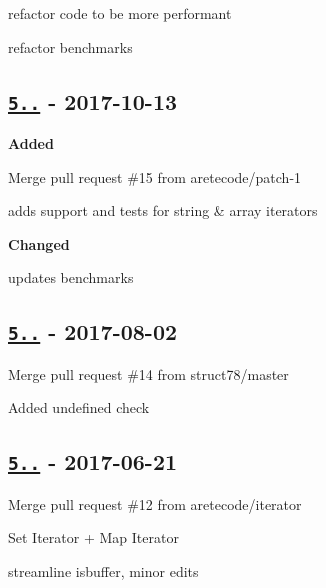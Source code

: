 \begin{DoxyItemize}
\item refactor code to be more performant
\item refactor benchmarks
\end{DoxyItemize}

\subsection*{\href{https://github.com/jonschlinkert/kind-of/compare/5.0.2...5.1.0}{\tt 5..} -\/ 2017-\/10-\/13}

{\bfseries Added}


\begin{DoxyItemize}
\item Merge pull request \#15 from aretecode/patch-\/1
\item adds support and tests for string \& array iterators
\end{DoxyItemize}

{\bfseries Changed}


\begin{DoxyItemize}
\item updates benchmarks
\end{DoxyItemize}

\subsection*{\href{https://github.com/jonschlinkert/kind-of/compare/5.0.1...5.0.2}{\tt 5..} -\/ 2017-\/08-\/02}


\begin{DoxyItemize}
\item Merge pull request \#14 from struct78/master
\item Added {\ttfamily undefined} check
\end{DoxyItemize}

\subsection*{\href{https://github.com/jonschlinkert/kind-of/compare/4.0.0...5.0.0}{\tt 5..} -\/ 2017-\/06-\/21}


\begin{DoxyItemize}
\item Merge pull request \#12 from aretecode/iterator
\item Set Iterator + Map Iterator
\item streamline {\ttfamily isbuffer}, minor edits
\end{DoxyItemize}

